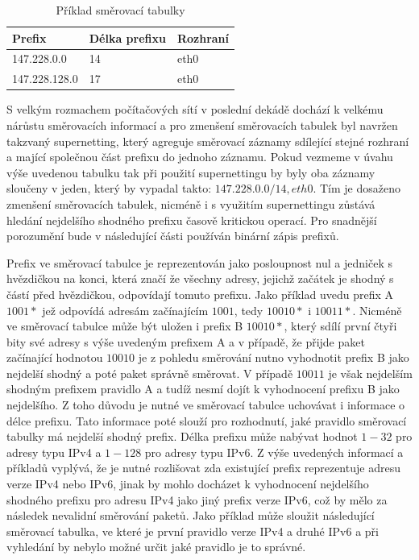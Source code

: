 \begin{table}[!htbp]
	\label{tab:routing-table}
	\center
    \begin{tabular}{|l|l|l|}
    \hline
    Prefix        & Délka prefixu & Rozhraní \\ \hline
    147.228.0.0   & 14            & eth0       \\ \hline
    147.228.128.0 & 17            & eth0       \\ \hline
    \end{tabular}
    \caption{Příklad směrovací tabulky}
\end{table}

S velkým rozmachem počítačových sítí v poslední dekádě dochází k velkému nárůstu směrovacích informací a
pro zmenšení směrovacích tabulek byl navržen takzvaný supernetting, který agreguje směrovací záznamy
sdílející stejné rozhraní a mající společnou část prefixu do jednoho záznamu.
Pokud vezmeme v úvahu výše uvedenou tabulku tak při použití supernettingu by byly oba záznamy sloučeny
v jeden, který by vypadal takto: $147.228.0.0/14, eth0$.
Tím je dosaženo zmenšení směrovacích tabulek, nicméně i s využitím supernettingu zůstává hledání nejdelšího shodného
prefixu časově kritickou operací.
Pro snadnější porozumění bude v následující části používán binární zápis prefixů.

Prefix ve směrovací tabulce je reprezentován jako posloupnost nul a jedniček s hvězdičkou na konci,
která značí že všechny adresy, jejichž začátek je shodný s částí před hvězdičkou, odpovídají tomuto prefixu.
Jako příklad uvedu prefix A $1001*$ jež odpovídá adresám začínajícím $1001$, tedy $10010*$ i $10011*$.
Nicméně ve směrovací tabulce může být uložen i prefix B $10010*$, který sdílí první čtyři bity své adresy
s výše uvedeným prefixem A a v případě, že přijde paket začínající hodnotou $10010$ je z pohledu směrování
nutno vyhodnotit prefix B jako nejdelší shodný a poté paket správně směrovat. V případě $10011$ je však nejdelším
shodným prefixem pravidlo A a tudíž nesmí dojít k vyhodnocení prefixu B jako nejdelšího.
Z toho důvodu je nutné ve směrovací tabulce uchovávat i informace o délce prefixu.
Tato informace poté slouží pro rozhodnutí, jaké pravidlo směrovací tabulky má nejdelší shodný prefix.
Délka prefixu může nabývat hodnot $1-32$ pro adresy typu
IPv4 a $1-128$ pro adresy typu IPv6.
Z výše uvedených informací a příkladů vyplývá,
že je nutné rozlišovat zda existující prefix reprezentuje adresu verze IPv4 nebo IPv6,
jinak by mohlo docházet k vyhodnocení nejdelšího shodného prefixu pro adresu IPv4
jako jiný prefix verze IPv6, což by mělo za následek nevalidní směrování paketů.
Jako příklad může sloužit následující směrovací tabulka, ve které je první pravidlo
verze IPv4 a druhé IPv6 a při vyhledání by nebylo možné určit jaké pravidlo je to správné.

